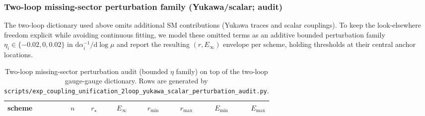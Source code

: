 \subsubsection{Two-loop missing-sector perturbation family (Yukawa/scalar; audit)}
\label{subsec:coupling_unification_two_loop_missing_sector}
\AuditTag The two-loop dictionary used above omits additional SM contributions (Yukawa traces and scalar couplings).
To keep the look-elsewhere freedom explicit while avoiding continuous fitting, we model these omitted terms as an additive bounded perturbation family
$\eta_i\in\{-0.02,0,0.02\}$ in $\mathrm{d}\alpha_i^{-1}/\mathrm{d}\log\mu$ and report the resulting $(r,E_\infty)$ envelope per scheme, holding thresholds at their central anchor locations.

%

\begin{table}[H]
\centering
\small
\setlength{\tabcolsep}{8pt}
\renewcommand{\arraystretch}{1.15}
\begin{tabular}{lrrrrrrr}
\toprule
scheme & $n$ & $r_\star$ & $E_\infty$ & $r_{\min}$ & $r_{\max}$ & $E_{\min}$ & $E_{\max}$ \\
\midrule
%
\end{tabular}
\caption{Two-loop missing-sector perturbation audit (bounded $\eta$ family) on top of the two-loop gauge-gauge dictionary. Rows are generated by \texttt{scripts/exp\_coupling\_unification\_2loop\_yukawa\_scalar\_perturbation\_audit.py}.}
\label{tab:coupling_unification_2loop_yukawa_scalar_audit}
\end{table}
